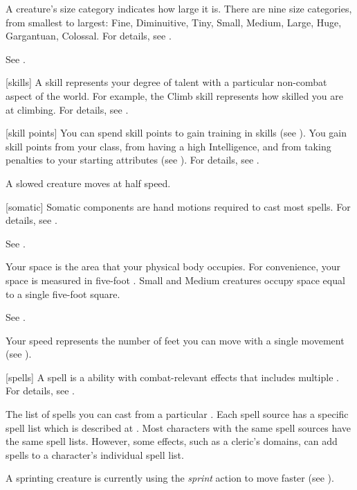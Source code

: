  A creature's size category indicates how large it is.
There are nine size categories, from smallest to largest: Fine, Diminuitive, Tiny, Small, Medium, Large, Huge, Gargantuan, Colossal.
For details, see .

 See .

[skills] A skill represents your degree of talent with a particular non-combat aspect of the world.
For example, the Climb skill represents how skilled you are at climbing.
For details, see .

[skill points] You can spend skill points to gain training in skills (see ).
You gain skill points from your class, from having a high Intelligence, and from taking penalties to your starting attributes (see ).
For details, see .

 A slowed creature moves at half speed.

[somatic] Somatic components are hand motions required to cast most spells.
For details, see .

 See .

 Your space is the area that your physical body occupies.
For convenience, your space is measured in five-foot .
Small and Medium creatures occupy space equal to a single five-foot square.

 See .

 Your speed represents the number of feet you can move with a single movement (see ).

[spells] A spell is a  ability with combat-relevant effects that includes multiple .
For details, see .

 The list of spells you can cast from a particular .
Each spell source has a specific spell list which is described at .
Most characters with the same spell sources have the same spell lists.
However, some effects, such as a cleric's domains, can add spells to a character's individual spell list.

 A sprinting creature is currently using the \textit{sprint} action to move faster (see ).

